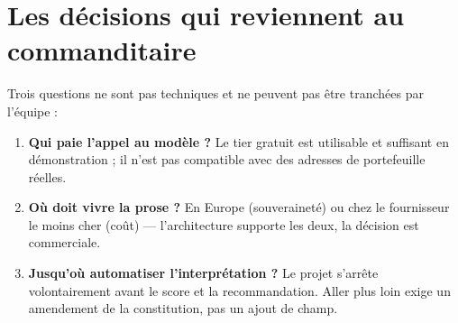 \section{Les décisions qui reviennent au commanditaire}

Trois questions ne sont pas techniques et ne peuvent pas être tranchées par
l'équipe :

\begin{enumerate}
  \item \textbf{Qui paie l'appel au modèle ?} Le tier gratuit est utilisable et
    suffisant en démonstration ; il n'est pas compatible avec des adresses de
    portefeuille réelles.
  \item \textbf{Où doit vivre la prose ?} En Europe (souveraineté) ou chez le
    fournisseur le moins cher (coût) — l'architecture supporte les deux, la
    décision est commerciale.
  \item \textbf{Jusqu'où automatiser l'interprétation ?} Le projet s'arrête
    volontairement avant le score et la recommandation. Aller plus loin exige un
    amendement de la constitution, pas un ajout de champ.
  \end{enumerate}
